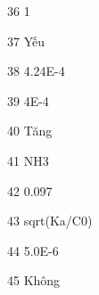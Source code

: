 \begin{loigiaibt}{36}
 1
\end{loigiaibt}
\begin{loigiaibt}{37}
 Yếu
\end{loigiaibt}
\begin{loigiaibt}{38}
 4.24E-4
\end{loigiaibt}
\begin{loigiaibt}{39}
 4E-4
\end{loigiaibt}
\begin{loigiaibt}{40}
 Tăng
\end{loigiaibt}
\begin{loigiaibt}{41}
 NH3
\end{loigiaibt}
\begin{loigiaibt}{42}
 0.097
\end{loigiaibt}
\begin{loigiaibt}{43}
 sqrt(Ka/C0)
\end{loigiaibt}
\begin{loigiaibt}{44}
 5.0E-6
\end{loigiaibt}
\begin{loigiaibt}{45}
 Không
\end{loigiaibt}
